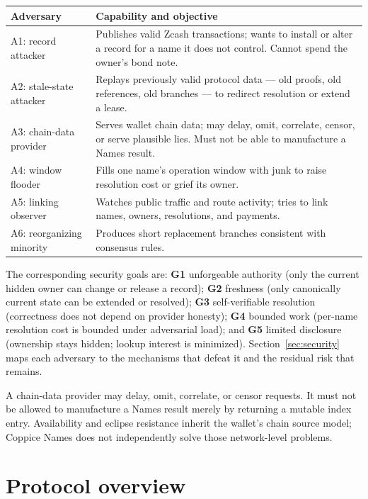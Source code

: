 \documentclass[11pt]{article}
\begin{document}
\begin{center}
\small
\begin{tabular}{>{\raggedright\arraybackslash}p{}>{\raggedright\arraybackslash}p{}}
\toprule
Adversary & Capability and objective \\
\midrule
A1: record attacker & Publishes valid Zcash transactions; wants to install or alter a record for a name it does not control. Cannot spend the owner's bond note. \\
A2: stale-state attacker & Replays previously valid protocol data --- old proofs, old references, old branches --- to redirect resolution or extend a lease. \\
A3: chain-data provider & Serves wallet chain data; may delay, omit, correlate, censor, or serve plausible lies. Must not be able to manufacture a Names result. \\
A4: window flooder & Fills one name's operation window with junk to raise resolution cost or grief its owner. \\
A5: linking observer & Watches public traffic and route activity; tries to link names, owners, resolutions, and payments. \\
A6: reorganizing minority & Produces short replacement branches consistent with consensus rules. \\
\bottomrule
\end{tabular}
\end{center}

The corresponding security goals are: \textbf{G1} unforgeable authority (only
the current hidden owner can change or release a record); \textbf{G2}
freshness (only canonically current state can be extended or resolved);
\textbf{G3} self-verifiable resolution (correctness does not depend on
provider honesty); \textbf{G4} bounded work (per-name resolution cost is
bounded under adversarial load); and \textbf{G5} limited disclosure
(ownership stays hidden; lookup interest is minimized). Section~\ref{sec:security}
maps each adversary to the mechanisms that defeat it and the residual risk
that remains.

A chain-data provider may delay, omit, correlate, or censor requests. It must
not be allowed to manufacture a Names result merely by returning a mutable
index entry. Availability and eclipse resistance inherit the wallet's chain
source model; Coppice Names does not independently solve those network-level
problems.

\section{Protocol overview}
\label{sec:overview}
\end{document}

